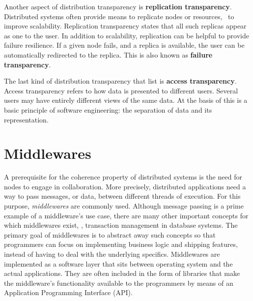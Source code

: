 Another aspect of distribution transparency is \textbf{replication transparency}. Distributed systems often provide means to replicate nodes or resources, \eg\ to improve scalability. Replication transparency states that all such replicas appear as one to the user. In addition to scalability, replication can be helpful to provide failure resilience. If a given node fails, and a replica is available, the user can be automatically redirected to the replica. This is also known as \textbf{failure transparency}.

The last kind of distribution transparency that \citeauthor*{tanenbaum2017distributed} list is \textbf{access transparency}. Access transparency refers to how data is presented to different users. Several users may have entirely different views of the same data. At the basis of this is a basic principle of software engineering: the separation of data and its representation.

%
%
%
%
%
%
%
%
%
%

\section{Middlewares} \label{sec:middlewares}
A prerequisite for the coherence property of distributed systems is the need for nodes to engage in collaboration. More precisely, distributed applications need a way to pass messages, or data, between different threads of execution. For this purpose, \emph{middlewares} \cite{bernstein1996middleware} are commonly used. Although message passing is a prime example of a middleware's use case, there are many other important concepts for which middlewares exist, \eg , transaction management in database systems. The primary goal of middlewares is to abstract away such concepts so that programmers can focus on implementing business logic and shipping features, instead of having to deal with the underlying specifics. Middlewares are implemented as a software layer that sits between operating system and the actual applications. They are often included in the form of libraries that make the middleware's functionality available to the programmers by means of an Application Programming Interface (API). 

